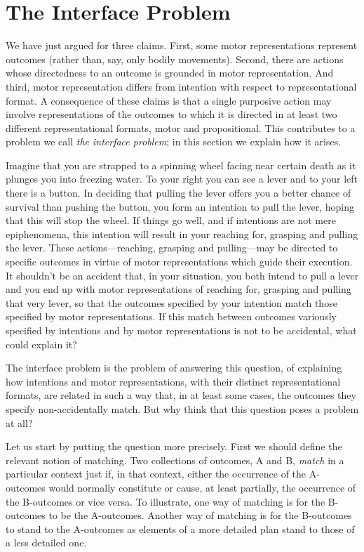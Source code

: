 \documentclass[12pt,\papersize]{extarticle}
\begin{document}
\section{The Interface Problem}

We have just argued for three claims. First, some motor representations represent outcomes (rather than, say, only bodily movements). Second, there are actions whose directedness to an outcome is grounded in motor representation. And third, motor representation differs from intention with respect to representational format. A consequence of these claims is that a single purposive action may involve representations of the outcomes to which it is directed in at least two different representational formats, motor and propositional. This contributes to a problem we call \emph{the interface problem}; in this section we explain how it arises.  

Imagine that you are strapped to a spinning wheel facing near certain death as it plunges you into freezing water. To your right you can see a lever and to your left there is a button. In deciding that pulling the lever offers you a better chance of survival than pushing the button, you form an intention to pull the lever, hoping that this will stop the wheel. If things go well, and if intentions are not mere epiphenomena, this intention will result in your reaching for, grasping and pulling the lever. These actions---reaching, grasping and pulling---may be directed to specific outcomes in virtue of motor representations which guide their execution. It shouldn't be an accident that, in your situation, you both intend to pull a lever and you end up with motor representations of reaching for, grasping and pulling that very lever, so that the outcomes specified by your intention match those specified by motor representations. If this match between outcomes variously specified by intentions and by motor representations is not to be accidental, what could explain it?  

The interface problem is the problem of answering this question, of explaining how intentions and motor representations, with their distinct representational formats, are related in such a way that, in at least some cases, the outcomes they specify non-accidentally match. But why think that this question poses a problem at all?  

Let us start by putting the question more precisely.  First we should define the relevant notion of matching. Two collections of outcomes, A and B, \emph{match} in a particular context just if, in that context, either the occurrence of the A-outcomes would normally constitute or cause, at least partially, the occurrence of the B-outcomes or vice versa. To illustrate, one way of matching is for the B-outcomes to be the A-outcomes. Another way of matching is for the B-outcomes to stand to the A-outcomes as elements of a more detailed plan stand to those of a less detailed one.
\end{document}
